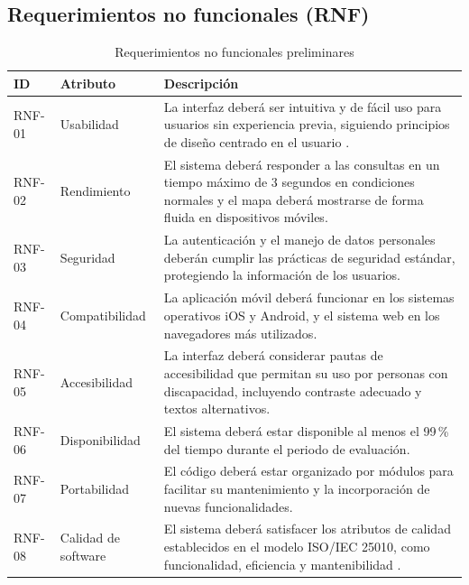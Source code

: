 \subsection{Requerimientos no funcionales (RNF)}

\begin{table}[H]
  \centering
  \caption{Requerimientos no funcionales preliminares}
  \begin{tablaAPA}
    \begin{tabular}{@{}p{2.0cm}p{3.4cm}p{10.4cm}@{}}
      \toprule
      \textbf{ID} & \textbf{Atributo} & \textbf{Descripci\'on} \\
      \midrule
      RNF-01 & Usabilidad & La interfaz deber\'a ser intuitiva y de f\'acil uso
      para usuarios sin experiencia previa, siguiendo principios de dise\~no
      centrado en el usuario \citep{nielsen1994}. \\
      \addlinespace
      RNF-02 & Rendimiento & El sistema deber\'a responder a las consultas en un
      tiempo m\'aximo de 3 segundos en condiciones normales y el mapa deber\'a
      mostrarse de forma fluida en dispositivos m\'oviles. \\
      \addlinespace
      RNF-03 & Seguridad & La autenticaci\'on y el manejo de datos personales
      deber\'an cumplir las pr\'acticas de seguridad est\'andar, protegiendo la
      informaci\'on de los usuarios. \\
      \addlinespace
      RNF-04 & Compatibilidad & La aplicaci\'on m\'ovil deber\'a funcionar en los
      sistemas operativos iOS y Android, y el sistema web en los navegadores
      m\'as utilizados. \\
      \addlinespace
      RNF-05 & Accesibilidad & La interfaz deber\'a considerar pautas de
      accesibilidad que permitan su uso por personas con discapacidad,
      incluyendo contraste adecuado y textos alternativos. \\
      \addlinespace
      RNF-06 & Disponibilidad & El sistema deber\'a estar disponible al menos el
      99\,\% del tiempo durante el periodo de evaluaci\'on. \\
      \addlinespace
      RNF-07 & Portabilidad & El c\'odigo deber\'a estar organizado por m\'odulos
      para facilitar su mantenimiento y la incorporaci\'on de nuevas
      funcionalidades. \\
      \addlinespace
      RNF-08 & Calidad de software & El sistema deber\'a satisfacer los atributos
      de calidad establecidos en el modelo ISO/IEC 25010, como funcionalidad,
      eficiencia y mantenibilidad \citep{iso25010}. \\
      \bottomrule
    \end{tabular}
  \end{tablaAPA}
\end{table}
